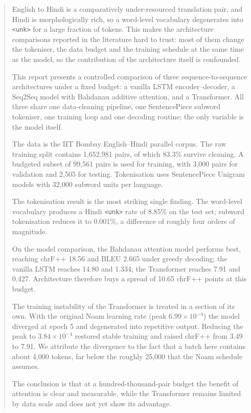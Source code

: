 \documentclass[a4paper,12pt]{vpcoe}
\begin{document}
\begin{abstract}
English to Hindi is a comparatively under-resourced translation pair, and Hindi is morphologically rich, so a word-level vocabulary degenerates into \texttt{<unk>} for a large fraction of tokens. This makes the architecture comparisons reported in the literature hard to trust: most of them change the tokeniser, the data budget and the training schedule at the same time as the model, so the contribution of the architecture itself is confounded.

This report presents a controlled comparison of three sequence-to-sequence architectures under a fixed budget: a vanilla LSTM encoder--decoder, a Seq2Seq model with Bahdanau additive attention, and a Transformer. All three share one data-cleaning pipeline, one SentencePiece subword tokeniser, one training loop and one decoding routine; the only variable is the model itself.

The data is the IIT Bombay English--Hindi parallel corpus. The raw training split contains 1,652,981 pairs, of which 83.3\% survive cleaning. A budgeted subset of 99,561 pairs is used for training, with 3,000 pairs for validation and 2,505 for testing. Tokenisation uses SentencePiece Unigram models with 32,000 subword units per language.

The tokenisation result is the most striking single finding. The word-level vocabulary produces a Hindi \texttt{<unk>} rate of 8.85\% on the test set; subword tokenisation reduces it to 0.001\%, a difference of roughly four orders of magnitude.

On the model comparison, the Bahdanau attention model performs best, reaching chrF++ 18.56 and BLEU 2.665 under greedy decoding; the vanilla LSTM reaches 14.80 and 1.334; the Transformer reaches 7.91 and 0.427. Architecture therefore buys a spread of 10.65 chrF++ points at this budget.

The training instability of the Transformer is treated in a section of its own. With the original Noam learning rate (peak $6.99\times10^{-4}$) the model diverged at epoch 5 and degenerated into repetitive output. Reducing the peak to $3.84\times10^{-4}$ restored stable training and raised chrF++ from 3.49 to 7.91. We attribute the divergence to the fact that a batch here contains about 4,000 tokens, far below the roughly 25,000 that the Noam schedule assumes.

The conclusion is that at a hundred-thousand-pair budget the benefit of attention is clear and measurable, while the Transformer remains limited by data scale and does not yet show its advantage.
\end{abstract}
\end{document}
